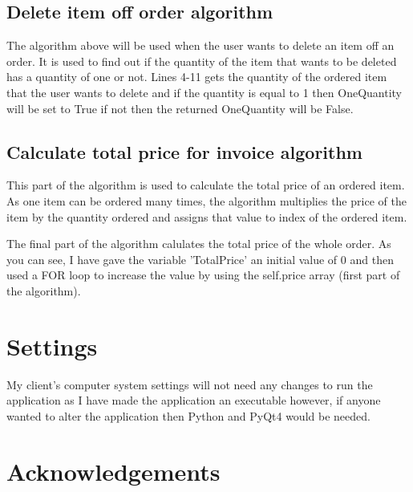 \newpage

\subsection{Delete item off order algorithm}
The algorithm above will be used when the user wants to delete an item off an order. It is used to find out if the quantity of the item that wants to be deleted has a quantity of one or not. Lines 4-11 gets the quantity of the ordered item that the user wants to delete and if the quantity is equal to 1 then OneQuantity will be set to True if not then the returned OneQuantity will be False. 

\subsection{Calculate total price for invoice algorithm}

This part of the algorithm is used to calculate the total price of an ordered item. As one item can be ordered many times, the algorithm multiplies the price of the item by the quantity ordered and assigns that value to index of the ordered item.

The final part of the algorithm calulates the total price of the whole order. As you can see, I have gave the variable 'TotalPrice' an initial value of 0 and then used a FOR loop to increase the value by using the self.price array (first part of the algorithm).


\section{Settings}

My client's computer system settings will not need any changes to run the application as I have made the application an executable however, if anyone wanted to alter the application then Python and PyQt4 would be needed.

\section{Acknowledgements}

